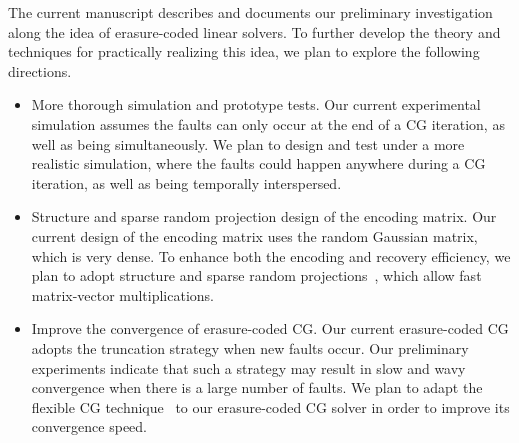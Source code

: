 \documentclass[11pt]{article}
\begin{document}
The current manuscript describes and documents our preliminary investigation
along the idea of erasure-coded linear solvers. To further develop the theory and
techniques for practically realizing this idea, we plan to explore the following directions.
\begin{itemize}
\item More thorough simulation and prototype tests. Our current experimental simulation
assumes the faults can only occur at the end of a CG iteration, as well as being
simultaneously. We plan to design and test under a more realistic simulation,
where the faults could happen anywhere during a CG iteration, as well as being
temporally interspersed.
\item Structure and sparse random projection design of the encoding matrix.
Our current design of the encoding matrix  uses the random Gaussian matrix,
which is very dense. To enhance both the encoding and recovery efficiency, we plan
to adopt structure and sparse random projections~\cite{ClarksonDMMMW:2013,FoucartR:2013,MengM:2013},
which allow fast matrix-vector multiplications.
\item Improve the convergence of erasure-coded CG. Our current erasure-coded CG
adopts the truncation strategy when new faults occur. Our preliminary experiments
indicate that such a strategy may result in slow and wavy convergence when there
is a large number of faults. We plan to adapt the flexible CG technique~\cite{Notay:2000}
to our erasure-coded CG solver in order to improve its convergence speed.
\end{itemize}



\end{document}
